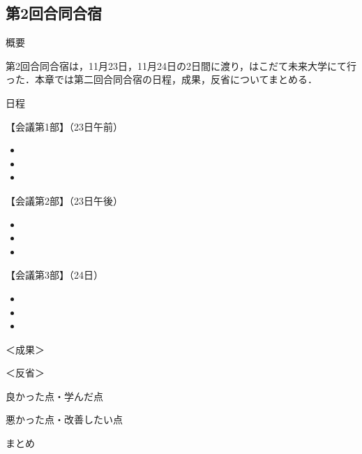 \subsection{第2回合同合宿}
\par
概要
\par 
第2回合同合宿は，11月23日，11月24日の2日間に渡り，はこだて未来大学にて行った．本章では第二回合同合宿の日程，成果，反省についてまとめる．
\par
日程
\par
【会議第1部】（23日午前）
\begin{itemize}
\item 
\item 
\item 
\end{itemize}
【会議第2部】（23日午後）
\begin{itemize}
\item 
\item 
\item 
\end{itemize}
【会議第3部】（24日）
\begin{itemize}
\item 
\item 
\item 
\end{itemize}
＜成果＞
\par  
\par
＜反省＞
\par

\par
良かった点・学んだ点
\begin{itemize}

\end{itemize}
\par
悪かった点・改善したい点
\begin{itemize}

\end{itemize}
\par
まとめ
\par

